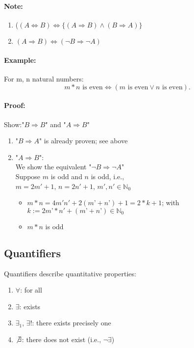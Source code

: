 \documentclass[twocolumn]{article}
\begin{document}
			\paragraph{Note:}
				\begin{enumerate}
				\item ($(A\Leftrightarrow B)
					\Leftrightarrow
					\{(A\Rightarrow B)\wedge(B\Rightarrow A)\}$
				\item $(A\Rightarrow B)\Leftrightarrow(\neg B\Rightarrow\neg A)$ 
				\end{enumerate}
			\paragraph{Example:}
				For m, n natural numbers:
				\[
				m*n\mbox{ is even}\Leftrightarrow(\mbox{$m$ is even}\vee n\mbox{ is even})
				.\] 
			\paragraph{Proof:}
				Show:"$B\Rightarrow B$" and "$A\Rightarrow B$"
				\begin{enumerate}
				\item "$B\Rightarrow A$" is already proven; see above
				\item "$A\Rightarrow B$":\\
			 		We show the equivalent "$\neg B\Rightarrow\neg A$"\\
					Suppose $m$ is odd and $n$ is odd, i.e.,\\
					$m=2m'+1$, $n=2n'+1$, $m',n'\in\mathbb N_0$   
					\begin{itemize}%
					\renewcommand{\labelitemi}{$\Rightarrow$}
					\item $m*n=4m'n'+2(m’+n’)+1=2*k+1$; with $k:=2m’*n'+(m’+n’)\in\mathbb N_0$
				\item $m*n$ is odd 
					\end{itemize}
				\end{enumerate}

	\subsection{Quantifiers}
		Quantifiers describe quantitative properties:
		\begin{enumerate}
		\item $\forall$: for all
		\item $\exists$: exists
		\item $\exists_1$, $\exists!$: there exists precisely one
		\item $\not\exists$: there does not exist (i.e., $\neg\exists$)
		\end{enumerate}
\end{document}
